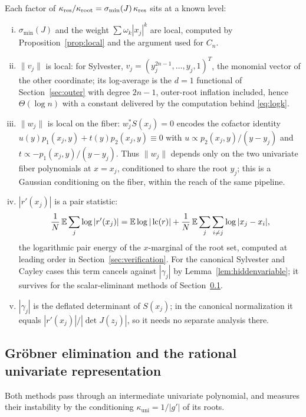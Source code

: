 Each factor of $\kappa_{\mathrm{res}}/\kappa_{\mathrm{root}} = \sigma_{\min}(J)\,\kappa_{\mathrm{res}}$
sits at a known level:
\begin{enumerate}[(i)]
  \item $\sigma_{\min}(J)$ and the weight $\sum\omega_k|x_j|^k$ are local, computed by
    Proposition~\ref{prop:local} and the argument used for $C_n$.
  \item $\|v_j\|$ is local: for Sylvester, $v_j = (y_j^{2n-1},\dots,y_j,1)^T$, the
    monomial vector of the other coordinate; its log-average is the $d=1$ functional of
    Section~\ref{sec:outer} with degree $2n-1$, outer-root inflation included, hence
    $\Theta(\log n)$ with a constant delivered by the computation behind \eqref{eq:logk}.
  \item $\|w_j\|$ is local on the fiber: $w_j^*S(x_j) = 0$ encodes the cofactor identity
    $u(y)p_1(x_j,y) + t(y)p_2(x_j,y)\equiv0$ with $u\propto p_2(x_j,y)/(y-y_j)$ and
    $t\propto-p_1(x_j,y)/(y-y_j)$. Thus $\|w_j\|$ depends only on the two univariate fiber
    polynomials at $x=x_j$, conditioned to share the root $y_j$; this is a Gaussian
    conditioning on the fiber, within the reach of the same pipeline.
  \item $|r'(x_j)|$ is a pair statistic:
    \[
      \frac1N\,\mathbb{E}\sum_j\log|r'(x_j)|
      = \mathbb{E}\log|\operatorname{lc}(r)| + \frac1N\,\mathbb{E}\sum_j\sum_{i\ne j}\log|x_j-x_i|,
    \]
    the logarithmic pair energy of the $x$-marginal of the root set, computed at leading
    order in Section~\ref{sec:verification}. For the canonical Sylvester and Cayley cases
    this term cancels against $|\gamma_j|$ by Lemma~\ref{lem:hiddenvariable}; it survives
    for the scalar-eliminant methods of Section~\ref{sec:elimination}.
  \item $|\gamma_j|$ is the deflated determinant of $S(x_j)$; in the canonical
    normalization it equals $|r'(x_j)|/|\det J(z_j)|$, so it needs no separate analysis
    there.
\end{enumerate}

\subsection{Gr\"obner elimination and the rational univariate representation}
\label{sec:elimination}

Both methods pass through an intermediate univariate polynomial, and
\cite{graf2026numerical} measures their instability by the conditioning
$\kappa_{\mathrm{uni}} = 1/|g'|$ of its roots.

